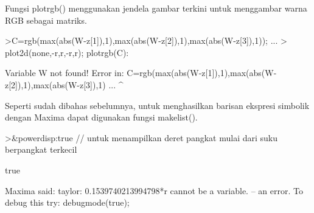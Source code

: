 \documentclass[a4paper,10pt]{article}
\begin{document}
\begin{eulernotebook}
\begin{eulercomment}
\begin{eulercomment}
\begin{eulercomment}
\begin{eulercomment}
\begin{eulercomment}
\begin{eulercomment}
\begin{eulercomment}
\begin{eulercomment}
\begin{eulercomment}
\begin{eulercomment}
\begin{eulercomment}
\begin{eulercomment}
\begin{eulercomment}
\begin{eulercomment}
\begin{eulercomment}
\begin{eulercomment}
\begin{eulercomment}
Fungsi plotrgb() menggunakan jendela gambar terkini untuk menggambar
warna RGB sebagai matriks.
\end{eulercomment}
\begin{eulerprompt}
>C=rgb(max(abs(W-z[1]),1),max(abs(W-z[2]),1),max(abs(W-z[3]),1)); ...
>  plot2d(none,-r,r,-r,r); plotrgb(C):
\end{eulerprompt}
\begin{euleroutput}
  Variable W not found!
  Error in:
  C=rgb(max(abs(W-z[1]),1),max(abs(W-z[2]),1),max(abs(W-z[3]),1) ...
                      ^
\end{euleroutput}
\begin{eulercomment}
Seperti sudah dibahas sebelumnya, untuk menghasilkan barisan ekspresi
simbolik dengan Maxima dapat digunakan fungsi makelist().
\end{eulercomment}
\begin{eulerprompt}
>&powerdisp:true // untuk menampilkan deret pangkat mulai dari suku berpangkat terkecil
\end{eulerprompt}
\begin{euleroutput}
  
                                   true
  
\end{euleroutput}
\begin{euleroutput}
  Maxima said:
  taylor: 0.1539740213994798*r cannot be a variable.
   -- an error. To debug this try: debugmode(true);
  

\end{euleroutput}
\end{eulercomment}
\end{eulercomment}
\end{eulercomment}
\end{eulercomment}
\end{eulercomment}
\end{eulercomment}
\end{eulercomment}
\end{eulercomment}
\end{eulercomment}
\end{eulercomment}
\end{eulercomment}
\end{eulercomment}
\end{eulercomment}
\end{eulercomment}
\end{eulercomment}
\end{eulercomment}
\end{eulernotebook}
\end{document}
